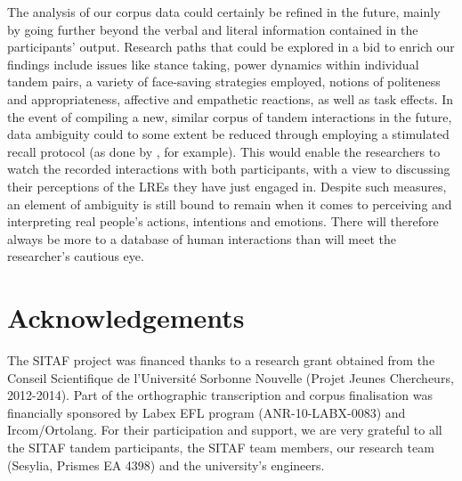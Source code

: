 \documentclass[output=paper,colorlinks,citecolor=brown,modfonts,nonflat]{../langscibook}
\begin{document}
The analysis of our corpus data could certainly be refined in the future, mainly by going further beyond the verbal and literal information contained in the participants’ output. Research paths that could be explored in a bid to enrich our findings include issues like stance taking, power dynamics within individual tandem pairs, a variety of face-saving strategies employed, notions of politeness and appropriateness, affective and empathetic reactions, as well as task effects. In the event of compiling a new, similar corpus of tandem interactions in the future, data ambiguity could to some extent be reduced through employing a stimulated recall protocol (as done by \citealt{MackeyEtAl2000}, for example). This would enable the researchers to watch the recorded interactions with both participants, with a view to discussing their perceptions of the LREs they have just engaged in. Despite such measures, an element of ambiguity is still bound to remain when it comes to perceiving and interpreting real people’s actions, intentions and emotions. There will therefore always be more to a database of human interactions than will meet the researcher’s cautious eye.

\section*{Acknowledgements}

The SITAF project was financed thanks to a research grant obtained from the Conseil Scientifique de l’Université Sorbonne Nouvelle (Projet Jeunes Chercheurs, 2012-2014). Part of the orthographic transcription and corpus finalisation was financially sponsored by Labex EFL program (ANR-10-LABX-0083) and Ircom/Ortolang. For their participation and support, we are very grateful to all the SITAF tandem participants, the SITAF team members, our research team (Sesylia, Prismes EA 4398) and the university’s engineers.

\sloppy\printbibliography[heading=subbibliography,notkeyword=this]
\end{document}
